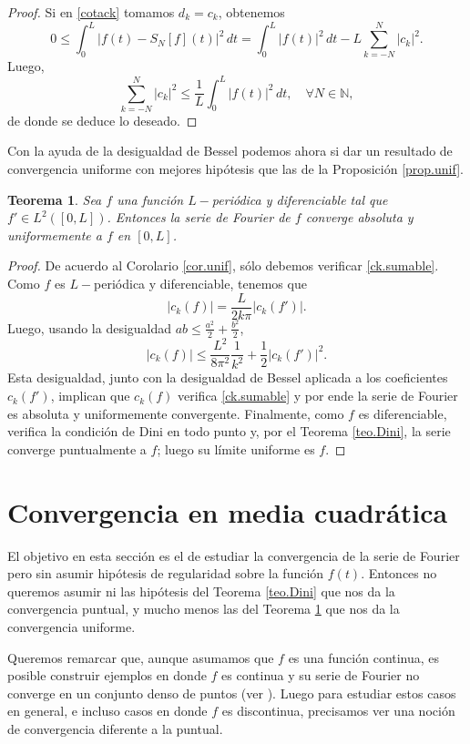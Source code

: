 \documentclass[12pt, a4paper]{amsbook}
\newcommand{\N}{{\mathbb N}}
\newtheorem{teo}{Teorema}[section]
\theoremstyle{remark}
\theoremstyle{definition}
\numberwithin{section}{chapter}
\numberwithin{subsection}{section}
\numberwithin{equation}{section}
\numberwithin{figure}{chapter}
\begin{document}
\begin{proof}
Si en \eqref{cotack} tomamos $d_k=c_k$, obtenemos
$$
0\le \int_0^L |f(t)-S_N[f](t)|^2\, dt = \int_0^L |f(t)|^2\, dt - L\sum_{k=-N}^N |c_k|^2.
$$
Luego,
$$
\sum_{k=-N}^N |c_k|^2\le \frac{1}{L}\int_0^L |f(t)|^2\, dt, \quad \forall N\in\N,
$$
de donde se deduce lo deseado.
\end{proof}

Con la ayuda de la desigualdad de Bessel podemos ahora si dar un resultado de convergencia uniforme con mejores hipótesis que las de la Proposición \ref{prop.unif}.
\begin{teo}\label{teo.unif}
Sea $f$ una función $L-$periódica y diferenciable tal que $f'\in L^2([0,L])$. Entonces la serie de Fourier de $f$ converge absoluta y uniformemente a $f$ en $[0, L]$.
\end{teo}

\begin{proof}
De acuerdo al Corolario \ref{cor.unif}, sólo debemos verificar \eqref{ck.sumable}. Como $f$ es $L-$periódica y diferenciable, tenemos que
$$
|c_k(f)| = \frac{L}{2k\pi}|c_k(f')|.
$$
Luego, usando la desigualdad $ab\le \frac{a^2}{2}+\frac{b^2}{2}$,
$$
|c_k(f)|\le \frac{L^2}{8\pi^2} \frac{1}{k^2} + \frac12 |c_k(f')|^2.
$$
Esta desigualdad, junto con la desigualdad de Bessel aplicada a los coeficientes $c_k(f')$, implican que $c_k(f)$ verifica \eqref{ck.sumable} y por ende la serie de Fourier es absoluta y uniformemente convergente. Finalmente, como $f$ es diferenciable, verifica la condición de Dini en todo punto y, por el Teorema \ref{teo.Dini}, la serie converge puntualmente a $f$; luego su límite uniforme es $f$.
\end{proof}

\section{Convergencia en media cuadrática}

El objetivo en esta sección es el de estudiar la convergencia de la serie de Fourier pero sin asumir hipótesis de regularidad sobre la función $f(t)$. Entonces no queremos asumir ni las hipótesis del Teorema \ref{teo.Dini} que nos da la convergencia puntual, y mucho menos las del Teorema \ref{teo.unif} que nos da la convergencia uniforme.

Queremos remarcar que, aunque asumamos que $f$ es una función continua, es posible construir ejemplos en donde $f$ es continua y su serie de Fourier no converge en un conjunto denso de puntos (ver \cite{Zygmund2}). Luego para estudiar estos casos en general, e incluso casos en donde $f$ es discontinua, precisamos ver una noción de convergencia diferente a la puntual. 
\end{document}
